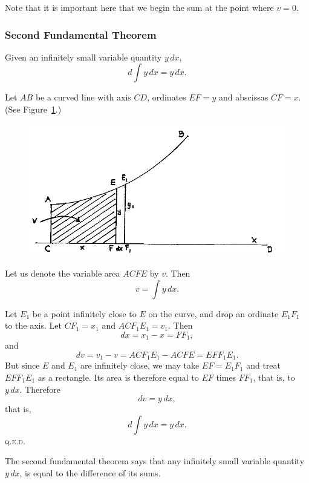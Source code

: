 \documentclass[twoside,openright]{article}
\begin{document}
Note that it is important here that we begin the sum at the point where $v=0$.


\subsubsection*{Second Fundamental Theorem}
\label{fund2}  Given an infinitely small variable quantity $y\,dx$,
$$d\int\!y\,dx = y\,dx.$$

Let $AB$ be a curved line with axis $CD$, ordinates $EF=y$ and
abscissas $CF = x$.  (See Figure~\ref{sfundfig}.)
\begin{figure}[htp]
  \begin{center}
    \includegraphics[width=\textwidth]{fig/Figure38}
    \caption{}
    \label{sfundfig}
    \vspace{-10pt}
  \end{center}
\end{figure}

Let us denote the variable area $ACFE$ by $v$.  Then 
$$v = \int\!y\,dx.$$

Let $E_1$ be a point infinitely close to $E$ on the curve, and drop an
ordinate $E_1F_1$ to the axis.  Let $CF_1 = x_1$ and $ACF_1E_1 = v_1$.
Then
$$dx = x_1 - x = FF_1,$$
and
$$dv = v_1 - v = ACF_1E_1 - ACFE = EFF_1E_1.$$
But since $E$ and $E_1$ are infinitely close, we may take
$EF = E_1F_1$ and treat $EFF_1E_1$ as a rectangle.  Its area is
therefore equal to $EF$ times $FF_1$, that is, to $y\,dx$.  Therefore
$$dv = y\,dx,$$
that is,
$$d\int\!y\,dx = y\,dx.$$
\textsc{q.e.d.}

The second fundamental theorem says that any infinitely small variable
quantity $y\,dx$, is equal to the difference of its sums.
\end{document}
